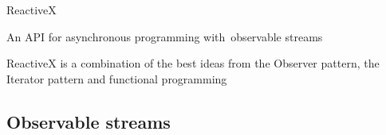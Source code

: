\documentclass[24pt]{beamer}
\begin{document}
\begin{frame}
    \begin{center}
        {\Huge {} ReactiveX}

        \vspace{20pt}

        {\Large An API for asynchronous programming with~\alert<2>{observable streams}}

        \vspace{20pt}

        ReactiveX is a combination of the best ideas from the Observer pattern, the Iterator pattern and functional programming
    \end{center}
\end{frame}

\subsection{Observable streams}
\end{document}

